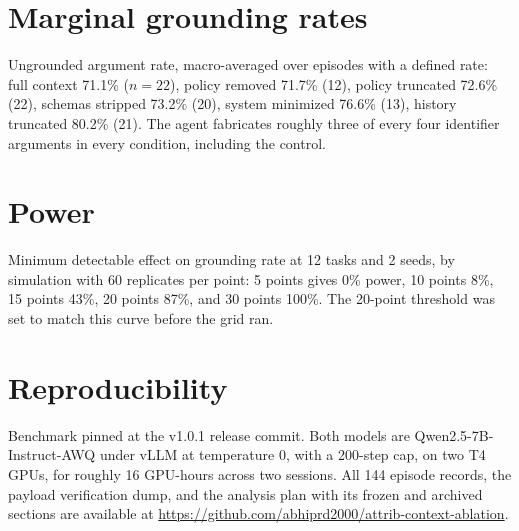 \documentclass{article}
\begin{document}
\section{Marginal grounding rates}

Ungrounded argument rate, macro-averaged over episodes with a defined rate: full
context 71.1\% ($n{=}22$), policy removed 71.7\% (12), policy truncated 72.6\% (22),
schemas stripped 73.2\% (20), system minimized 76.6\% (13), history truncated 80.2\%
(21). The agent fabricates roughly three of every four identifier arguments in every
condition, including the control.

\section{Power}

Minimum detectable effect on grounding rate at 12 tasks and 2 seeds, by simulation with
60 replicates per point: 5 points gives 0\% power, 10 points 8\%, 15 points 43\%, 20
points 87\%, and 30 points 100\%. The 20-point threshold was set to match this curve
before the grid ran.

\section{Reproducibility}

Benchmark pinned at the v1.0.1 release commit. Both models are Qwen2.5-7B-Instruct-AWQ under vLLM
at temperature 0, with a 200-step cap, on two T4 GPUs, for roughly 16 GPU-hours across
two sessions. All 144 episode records, the payload verification dump, and the analysis
plan with its frozen and archived sections are available at
\url{https://github.com/abhiprd2000/attrib-context-ablation}.
\end{document}
